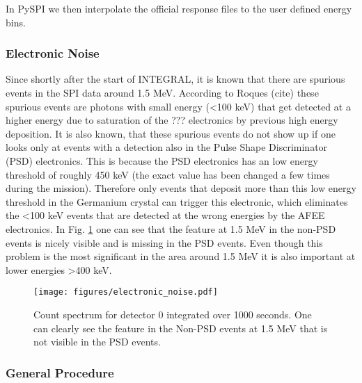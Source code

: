 \documentclass[twocolumn]{aa}
\begin{document}
In PySPI we then interpolate the official response files to the user defined energy bins.

\subsubsection*{Electronic Noise}

Since shortly after the start of INTEGRAL, it is known that there are spurious events in the SPI data around 1.5 MeV. According to Roques (cite) these spurious events are photons with small energy (<100 keV) that get detected at a higher energy due to saturation of the ??? electronics by previous high energy deposition. It is also known, that these spurious events do not show up if one looks only at events with a detection also in the Pulse Shape Discriminator (PSD) electronics. This is because the PSD electronics has an low energy threshold of roughly 450 keV (the exact value has been changed a few times during the mission). Therefore only events that deposit more than this low energy threshold in the Germanium crystal can trigger this electronic, which eliminates the <100 keV events that are detected at the wrong energies by the AFEE electronics. In Fig. \ref{fig:electronic} one can see that the feature at 1.5 MeV in the non-PSD events is nicely visible and is missing in the PSD events. Even though this problem is the most significant in the area around 1.5 MeV it is also important at lower energies >400 keV.


\begin{figure}
    \begin{centering}
        \texttt{[image: figures/electronic\_noise.pdf]}
        \caption{Count spectrum for detector 0 integrated over 1000 seconds. One can clearly see the feature in the Non-PSD events at 1.5 MeV that is not visible in the PSD events.}
        \label{fig:electronic}
    \end{centering}
\end{figure}

\subsubsection*{General Procedure}
\end{document}
